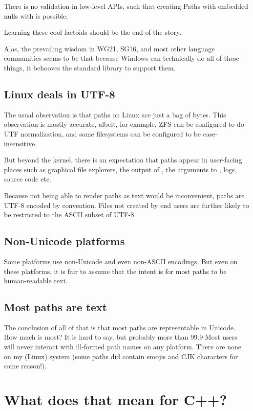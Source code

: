 \documentclass{wg21}
\begin{document}
There is no validation in low-level APIs, such that creating Paths with embedded nulls with  is possible.

Learning these cool factoids should be the end of the story.

Alas, the prevailing wisdom in WG21, SG16, and most other language communities seems to be that because Windows can technically do all of these
things, it behooves the standard library to support them.

\subsection{Linux deals in UTF-8}

The usual observation is that paths on Linux are just a bag of bytes.
This observation is mostly accurate, albeit, for example, ZFS can be configured to do UTF normalization, and some filesystems can be configured to be case-insensitive.

But beyond the kernel, there is an expectation that paths appear in user-facing places such as graphical file explorers, the output of ,
the arguments to , logs, source code etc.

Because not being able to render paths as text would be inconvenient, paths are UTF-8 encoded by convention.
Files not created by end users are further likely to be restricted to the ASCII subset of UTF-8.

\subsection{Non-Unicode platforms}

Some platforms use non-Unicode and even non-ASCII encodings.
But even on these platforms, it is fair to assume that the intent is for most paths to be human-readable text.

\subsection{Most paths are text}

The conclusion of all of that is that most paths are representable in Unicode.
How much is most? It is hard to say, but probably more than 99.9%
Most users will never interact with ill-formed path names on any platform.
There are none on my (Linux) system (some paths did contain emojis and CJK characters for some reason!).

\section{What does that mean for C++?}
\end{document}
